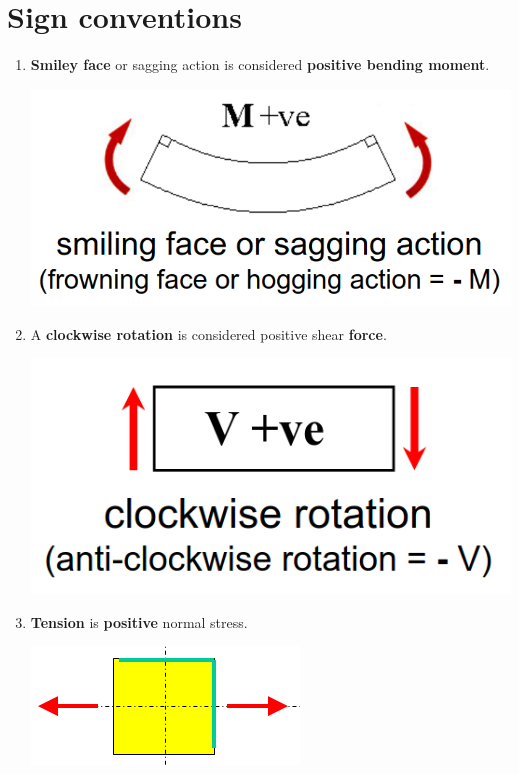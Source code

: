 \documentclass[11pt]{article}
\begin{document}
\section{Sign conventions}
\label{sec:org54cc58a}
\begin{enumerate}
\item \textbf{Smiley face} or sagging action is considered \textbf{positive bending moment}.
\begin{center}
\includegraphics[scale=0.6]{./images/bending-moment-sign-convention.png}
\end{center}

\item A \textbf{clockwise rotation} is considered positive shear \textbf{force}.
\begin{center}
\includegraphics[scale=0.6]{./images/shear-force-sign-convention.png}
\end{center}

\item \textbf{Tension} is \textbf{positive} normal stress.
\begin{center}
\includegraphics[scale=0.5]{./images/positive-normal-stress.png}
\end{center}


\end{enumerate}
\end{document}
